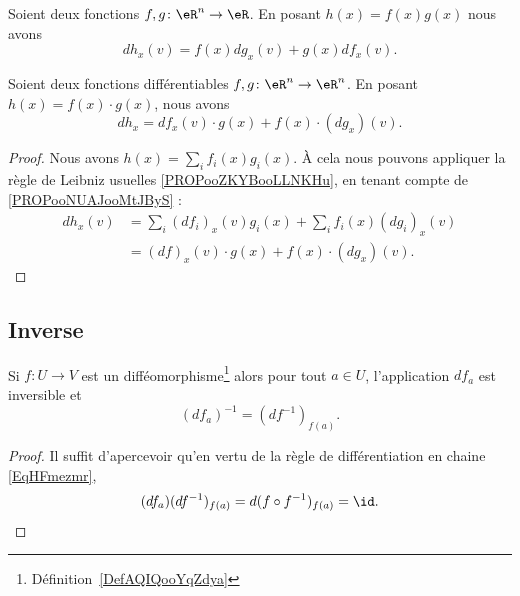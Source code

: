 \begin{proposition}	\label{PROPooZKYBooLLNKHu}
	Soient deux fonctions \(f,g \colon \eR^n\to \eR  \). En posant \( h(x)=f(x)g(x)\) nous avons
	\begin{equation}
		dh_x(v)=f(x)dg_x(v)+g(x)df_x(v).
	\end{equation}
\end{proposition}


\begin{proposition}	\label{PROPooOIMLooUhkkmy}
	Soient deux fonctions différentiables \(f,g \colon \eR^n\to \eR^n  \). En posant \( h(x)=f(x)\cdot g(x)\), nous avons
	\begin{equation}
		dh_x=df_x(v)\cdot g(x)+f(x)\cdot (dg_x)(v).
	\end{equation}
\end{proposition}

\begin{proof}
	Nous avons \( h(x)=\sum_if_i(x)g_i(x)\). À cela nous pouvons appliquer la règle de Leibniz usuelles \ref{PROPooZKYBooLLNKHu}, en tenant compte de \ref{PROPooNUAJooMtJByS} :
	\begin{subequations}
		\begin{align}
			dh_x(v) & =\sum_i(df_i)_x(v)g_i(x)+\sum_if_i(x)(dg_i)_x(v) \\
			        & = (df)_x(v)\cdot g(x)+f(x)\cdot (dg_x)(v).
		\end{align}
	\end{subequations}
\end{proof}

\subsection{Inverse}


\begin{lemma}       \label{LemooTJSZooWkuSzv}
	Si \( f\colon U\to V\) est un difféomorphisme\footnote{Définition~\ref{DefAQIQooYqZdya}} alors pour tout \( a\in U\), l'application \( df_a\) est inversible et
	\begin{equation}
		(df_a)^{-1}=(df^{-1})_{f(a)}.
	\end{equation}
\end{lemma}

\begin{proof}
	Il suffit d'apercevoir qu'en vertu de la règle de différentiation en chaine \eqref{EqHFmezmr},
	\begin{equation}
		(df_a)(df^{-1})_{f(a)}=d(f\circ f^{-1})_{f(a)}=\id.
	\end{equation}
\end{proof}

